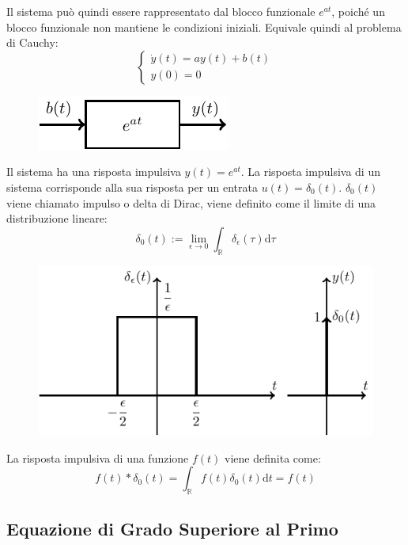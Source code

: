 \documentclass{article}
\numberwithin{equation}{subsection}
\newcommand{\df}{\mathrm{d}}
\begin{document}
Il sistema può quindi essere rappresentato dal blocco funzionale $e^{at}$, poiché un blocco funzionale non mantiene le condizioni iniziali. Equivale quindi al 
problema di Cauchy:
\begin{equation*}
    \begin{cases}
        \dot y(t)=ay(t)+b(t)\\
        y(0)=0
    \end{cases}
\end{equation*}
\begin{figure}[H]%
    \centering
    \includegraphics{blocco-funzionale-3.pdf}%
\end{figure}


Il sistema ha una risposta impulsiva $y(t)=e^{at}$. La risposta impulsiva di un sistema corrisponde alla sua risposta per un entrata $u(t)=\delta_0(t)$. 
$\delta_0(t)$ viene chiamato impulso o delta di Dirac, viene definito come il limite di una distribuzione lineare:
\begin{equation*}
    \delta_0(t):=\displaystyle\lim_{\epsilon\to0}\int_{\mathbb{R}}\delta_{\epsilon}(\tau)\df\tau
\end{equation*}
\begin{figure}[H]%
    \centering
    \includegraphics{impulso.pdf}%
\end{figure}

La risposta impulsiva di una funzione $f(t)$ viene definita come:
\begin{equation*}
    f(t)*\delta_0(t)=\int_{\mathbb{R}}f(t)\delta_0(t)\df t=f(t)
\end{equation*}

\subsection{Equazione di Grado Superiore al Primo}
\end{document}
